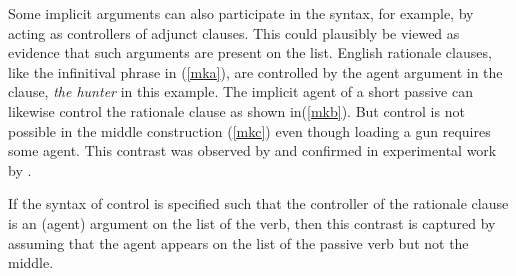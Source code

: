 \documentclass[output=paper
                ,modfonts
                ,nonflat
	        ,collection
	        ,collectionchapter
	        ,collectiontoclongg
 	        ,biblatex
                ,babelshorthands
                ,newtxmath
                ,draftmode
                ,colorlinks, citecolor=brown
]{./langsci/langscibook}
\begin{document}
Some implicit arguments can also participate in the syntax, for example, by acting as controllers of adjunct clauses.  This could plausibly be viewed as evidence that such arguments are present on the \argst list.
English rationale clauses, like the infinitival phrase in (\ref{mka}), are controlled  by the agent argument in the clause, \textit{the hunter} in this example.
The implicit agent of a short passive  can likewise control the rationale clause as shown in(\ref{mkb}).
But control is not possible in the middle construction (\ref{mkc}) even though loading a gun requires some agent.
This contrast was observed by \citet{KeyserandRoeper1984} and confirmed in experimental work by \citet{MaunerandKoenig2000}.  

\begin{exe}
\ex\label{mk}
\begin{xlist}
\end{xlist}
\end{exe}



\noindent
If the syntax of control  is specified such that the controller of the rationale clause is an (agent) argument on the \argst list of the verb, then this contrast is captured by assuming that the agent appears on the \argst list of the passive verb but not the middle.
\end{document}
